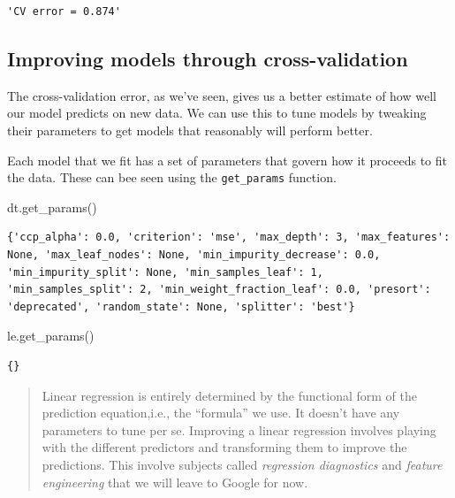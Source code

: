 \documentclass[
  letterpaper,
]{scrbook}
\newenvironment{Shaded}{\begin{snugshade}}{\end{snugshade}}
\newcommand{\NormalTok}[1]{#1}
\begin{document}
\begin{verbatim}
'CV error = 0.874'
\end{verbatim}

\hypertarget{improving-models-through-cross-validation}{%
\subsection{Improving models through cross-validation}\label{improving-models-through-cross-validation}}

The cross-validation error, as we've seen, gives us a better estimate of
how well our model predicts on new data. We can use this to tune models by tweaking their parameters to get models that reasonably will perform better.

Each model that we fit has a set of parameters that govern how it proceeds
to fit the data. These can bee seen using the \texttt{get\_params} function.

\begin{Shaded}
\begin{Highlighting}[]
\NormalTok{dt.get_params()}
\end{Highlighting}
\end{Shaded}

\begin{verbatim}
{'ccp_alpha': 0.0, 'criterion': 'mse', 'max_depth': 3, 'max_features': None, 'max_leaf_nodes': None, 'min_impurity_decrease': 0.0, 'min_impurity_split': None, 'min_samples_leaf': 1, 'min_samples_split': 2, 'min_weight_fraction_leaf': 0.0, 'presort': 'deprecated', 'random_state': None, 'splitter': 'best'}
\end{verbatim}

\begin{Shaded}
\begin{Highlighting}[]
\NormalTok{le.get_params()}
\end{Highlighting}
\end{Shaded}

\begin{verbatim}
{}
\end{verbatim}

\begin{quote}
Linear regression is entirely determined by the functional form of
the prediction equation,i.e., the ``formula'' we use. It doesn't have any parameters to tune per se. Improving a linear regression involves playing
with the different predictors and transforming them to improve the predictions. This involve subjects called \emph{regression diagnostics} and
\emph{feature engineering} that we will leave to Google for now.
\end{quote}
\end{document}

